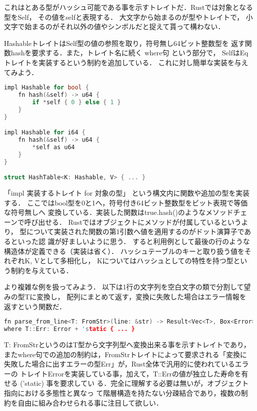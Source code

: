これはとある型がハッシュ可能である事を示すトレイトだ．Rustでは対象となる型をSelf，
その値をselfと表現する．
大文字から始まるのが型やトレイトで，
小文字で始まるのがそれ以外の値やシンボルだと捉えて貰って構わない．

HashableトレイトはSelf型の値の参照を取り，符号無し64ビット整数型を
返す関数hashを要求する．また，トレイト名に続く where句 という部分で，
SelfはEqトレイトを実装するという制約を追加している．
これに対し簡単な実装を与えてみよう．

\begin{lstlisting}[language={C++},caption=トレイトの実装と利用例,label=hash_use]
impl Hashable for bool {
    fn hash(&self) -> u64 {
        if *self { 0 } else { 1 }
    }
}

impl Hashable for i64 {
    fn hash(&self) -> u64 {
        *self as u64
    }
}

struct HashTable<K: Hashable, V> { ... }
\end{lstlisting}

「impl 実装するトレイト for 対象の型」 という構文内に関数や追加の型を実装する．
ここではbool型を0と1へ，符号付き64ビット整数型をビット表現で等価な符号無しへ
変換している．実装した関数はtrue.hash()のようなメソッドチェーンで呼び出せる．
Rustではオブジェクトにメソッドが付属しているというより，
型について実装された関数の第1引数へ値を適用するのがドット演算子であるといった認
識が好ましいように思う．
すると利用例として最後の行のような構造体が定義できる（実装は省く）．
ハッシュテーブルのキーと取り扱う値をそれぞれK, Vとして多相化し，
Kについてはハッシュとしての特性を持つ型という制約を与えている．

より複雑な例を扱ってみよう．
以下は1行の文字列を空白文字の類で分割して望みの型Tに変換し，
配列にまとめて返す，変換に失敗した場合はエラー情報を返すという関数だ．

\begin{lstlisting}[language={C++},caption=トレイトの複合, label=trait_cmpl]
fn parse_from_line<T: FromStr>(line: &str) -> Result<Vec<T>, Box<Error>>
where T::Err: Error + 'static { ... }
\end{lstlisting}

T: FromStrというのはT型から文字列型へ変換出来る事を示すトレイトであり，
またwhere句での追加の制約は，FromStrトレイトによって要求される「変換に
失敗した場合に出すエラーの型Err」が，Rust全体で汎用的に使われているエラーの
トレイトErrorを実装している事，加えて，T::Errの値が独立した寿命を有せる ('static) 事を要求してい
る．完全に理解する必要は無いが，オブジェクト指向における多態性と異なっ
て階層構造を持たない分疎結合であり，複数の制約を自由に組み合わせられる事に注目して欲しい．

